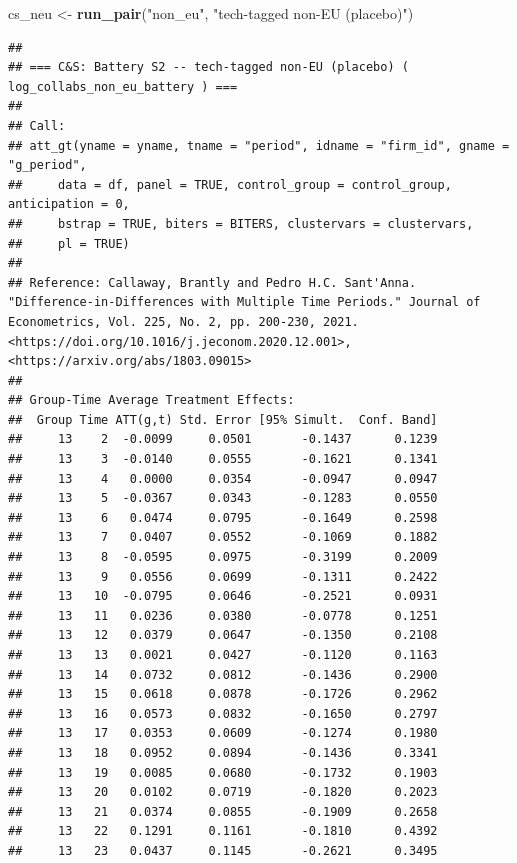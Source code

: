 \documentclass[
]{article}
\newenvironment{Shaded}{\begin{snugshade}}{\end{snugshade}}
\newcommand{\FunctionTok}[1]{\textcolor[rgb]{0.13,0.29,0.53}{\textbf{#1}}}
\newcommand{\NormalTok}[1]{#1}
\newcommand{\OtherTok}[1]{\textcolor[rgb]{0.56,0.35,0.01}{#1}}
\newcommand{\StringTok}[1]{\textcolor[rgb]{0.31,0.60,0.02}{#1}}
\begin{document}
\begin{Shaded}
\begin{Highlighting}[]
\NormalTok{cs\_neu  }\OtherTok{\textless{}{-}} \FunctionTok{run\_pair}\NormalTok{(}\StringTok{"non\_eu"}\NormalTok{,       }\StringTok{"tech{-}tagged non{-}EU (placebo)"}\NormalTok{)}
\end{Highlighting}
\end{Shaded}

\begin{verbatim}
## 
## === C&S: Battery S2 -- tech-tagged non-EU (placebo) ( log_collabs_non_eu_battery ) ===
## 
## Call:
## att_gt(yname = yname, tname = "period", idname = "firm_id", gname = "g_period", 
##     data = df, panel = TRUE, control_group = control_group, anticipation = 0, 
##     bstrap = TRUE, biters = BITERS, clustervars = clustervars, 
##     pl = TRUE)
## 
## Reference: Callaway, Brantly and Pedro H.C. Sant'Anna.  "Difference-in-Differences with Multiple Time Periods." Journal of Econometrics, Vol. 225, No. 2, pp. 200-230, 2021. <https://doi.org/10.1016/j.jeconom.2020.12.001>, <https://arxiv.org/abs/1803.09015> 
## 
## Group-Time Average Treatment Effects:
##  Group Time ATT(g,t) Std. Error [95% Simult.  Conf. Band]  
##     13    2  -0.0099     0.0501       -0.1437      0.1239  
##     13    3  -0.0140     0.0555       -0.1621      0.1341  
##     13    4   0.0000     0.0354       -0.0947      0.0947  
##     13    5  -0.0367     0.0343       -0.1283      0.0550  
##     13    6   0.0474     0.0795       -0.1649      0.2598  
##     13    7   0.0407     0.0552       -0.1069      0.1882  
##     13    8  -0.0595     0.0975       -0.3199      0.2009  
##     13    9   0.0556     0.0699       -0.1311      0.2422  
##     13   10  -0.0795     0.0646       -0.2521      0.0931  
##     13   11   0.0236     0.0380       -0.0778      0.1251  
##     13   12   0.0379     0.0647       -0.1350      0.2108  
##     13   13   0.0021     0.0427       -0.1120      0.1163  
##     13   14   0.0732     0.0812       -0.1436      0.2900  
##     13   15   0.0618     0.0878       -0.1726      0.2962  
##     13   16   0.0573     0.0832       -0.1650      0.2797  
##     13   17   0.0353     0.0609       -0.1274      0.1980  
##     13   18   0.0952     0.0894       -0.1436      0.3341  
##     13   19   0.0085     0.0680       -0.1732      0.1903  
##     13   20   0.0102     0.0719       -0.1820      0.2023  
##     13   21   0.0374     0.0855       -0.1909      0.2658  
##     13   22   0.1291     0.1161       -0.1810      0.4392  
##     13   23   0.0437     0.1145       -0.2621      0.3495  

\end{verbatim}
\end{document}
